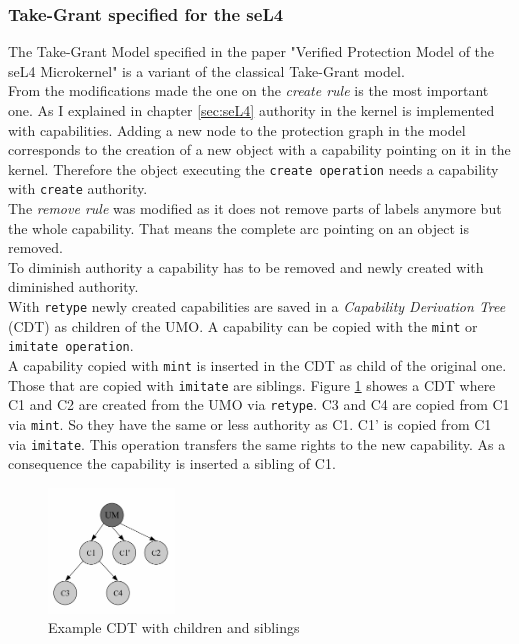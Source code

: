 \subsubsection{Take-Grant specified for the seL4}\label{specT}
The Take-Grant Model specified in the paper "Verified Protection Model of the seL4 Microkernel" \cite{TakeG} is a variant of the classical Take-Grant model. \\
From the modifications made the one on the \textit{create rule} is the most important one. As I explained in chapter \ref{sec:seL4} authority in the kernel is implemented with capabilities. Adding a new node to the protection graph in the model corresponds to the creation of a new object with a capability pointing on it in the kernel. Therefore the object executing the \texttt{create operation} needs a capability with \texttt{create} authority. \\
The \textit{remove rule} was modified as it does not remove parts of labels anymore but the whole capability. That means the complete arc pointing on an object is removed. \\
To diminish authority a capability has to be removed and newly created with diminished authority. \\
With \texttt{retype} newly created capabilities are saved in a \textit{Capability Derivation Tree} (CDT) as children of the UMO. A capability can be copied with the \texttt{mint} or \texttt{imitate operation}. \\ 
A capability  copied with \texttt{mint} is inserted in the CDT as child of the original one. Those that are copied with \texttt{imitate} are siblings. Figure \ref{fig:cdt} showes a CDT where C1 and C2 are created from the UMO via \texttt{retype}. C3 and C4 are copied from C1 via \texttt{mint}. So they have the same or less authority as C1. C1' is copied from C1 via \texttt{imitate}. This operation transfers the same rights to the new capability. As a consequence the capability is inserted a sibling of C1. \\
	\begin{figure}[H]
	\centering
	\includegraphics[width=0.3\textwidth]{./Pictures/CDT.jpg}
	\caption[CDT]{Example CDT with children and siblings \cite{PhDseL4}}
	\label{fig:cdt}
	\end{figure}
